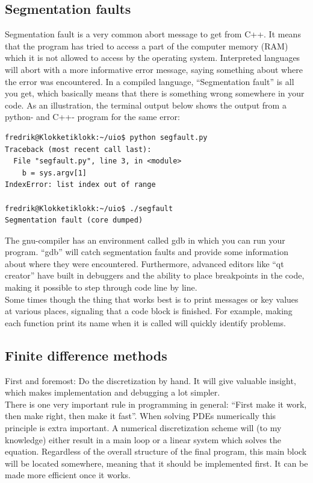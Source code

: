 \subsection{Segmentation faults}
Segmentation fault is a very common abort message to get from C++. It means that the program has tried to access a part of the computer memory (RAM) which it is not allowed to access by the operating system. 
Interpreted languages will abort with a more informative error message, saying something about where the error was encountered. 
In a compiled language, ``Segmentation fault'' is all you get, which basically means that there is something wrong somewhere in your code. 
As an illustration, the terminal output below shows the output from a python- and C++- program for the same error:
\begin{lstlisting}
fredrik@Klokketiklokk:~/uio$ python segfault.py 
Traceback (most recent call last):
  File "segfault.py", line 3, in <module>
    b = sys.argv[1]
IndexError: list index out of range

fredrik@Klokketiklokk:~/uio$ ./segfault 
Segmentation fault (core dumped)
\end{lstlisting}

The gnu-compiler has an environment called gdb in which you can run your program. 
``gdb'' will catch segmentation faults and provide some information about where they were encountered. 
Furthermore, advanced editors like ``qt creator'' have built in debuggers and the ability to place breakpoints in the code, making it possible to step through code line by line. \\
Some times though the thing that works best is to print messages or key values at various places, signaling that a code block is finished. 
For example, making each function print its name when it is called will quickly identify problems. 

\subsection{Finite difference methods}
First and foremost: Do the discretization by hand. 
It will give valuable insight, which makes implementation and debugging a lot simpler. \\

\noindent There is one very important rule in programming in general: ``First make it work, then make right, then make it fast''. 
When solving PDEs numerically this principle is extra important. 
A numerical discretization scheme will (to my knowledge) either result in a main loop or a linear system which solves the equation. 
Regardless of the overall structure of the final program, this main block will be located somewhere, meaning that it should be implemented first. 
It can be made more efficient once it works. \\

